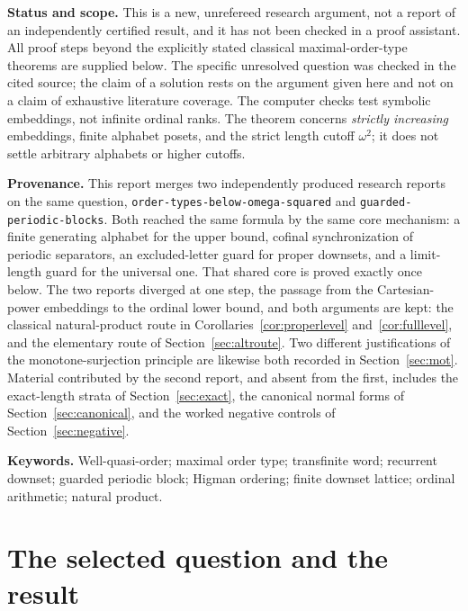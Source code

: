 \documentclass[11pt,a4paper]{article}
\numberwithin{equation}{section}
\theoremstyle{definition}
\theoremstyle{remark}
\begin{document}
\begin{resultbox}
\textbf{Status and scope.} This is a new, unrefereed research argument, not a
report of an independently certified result, and it has not been checked in a
proof assistant. All proof steps beyond the explicitly stated classical
maximal-order-type theorems are supplied below. The specific unresolved
question was checked in the cited source; the claim of a solution rests on the
argument given here and not on a claim of exhaustive literature coverage.
The computer checks test symbolic embeddings, not infinite ordinal ranks.
The theorem concerns \emph{strictly increasing} embeddings, finite alphabet
posets, and the strict length cutoff $\omega^2$; it does not settle arbitrary
alphabets or higher cutoffs.

\medskip
\textbf{Provenance.} This report merges two independently produced research
reports on the same question, \texttt{order-types-below-omega-squared} and
\texttt{guarded-periodic-blocks}. Both reached the same formula by the same
core mechanism: a finite generating alphabet for the upper bound, cofinal
synchronization of periodic separators, an excluded-letter guard for proper
downsets, and a limit-length guard for the universal one. That shared core is
proved exactly once below. The two reports diverged at one step, the passage
from the Cartesian-power embeddings to the ordinal lower bound, and both
arguments are kept: the classical natural-product route in
Corollaries~\ref{cor:properlevel} and~\ref{cor:fulllevel}, and the elementary
route of Section~\ref{sec:altroute}. Two different justifications of the
monotone-surjection principle are likewise both recorded in
Section~\ref{sec:mot}. Material contributed by the second report, and absent
from the first, includes the exact-length strata of
Section~\ref{sec:exact}, the canonical normal forms of
Section~\ref{sec:canonical}, and the worked negative controls of
Section~\ref{sec:negative}.
\end{resultbox}

\vfill
\noindent\small\textbf{Keywords.} Well-quasi-order; maximal order type;
transfinite word; recurrent downset; guarded periodic block; Higman ordering;
finite downset lattice; ordinal arithmetic; natural product.
\newpage
\begingroup
\small
\setlength{\parskip}{0pt}
\tableofcontents
\endgroup
\newpage

\section{The selected question and the result}
\label{sec:intro}
\end{document}
